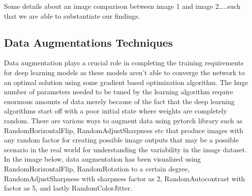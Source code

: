 \documentclass[conference]{IEEEtran}
\begin{document}
Some details about an image comparison between image 1 and image 2…..such that we are able to substantiate our findings.

\subsection{Data Augmentations Techniques}
Data augmentation plays a crucial role in completing the training requirements for deep learning models as these models aren’t able to converge the network to an optimal solution using some gradient based optimization algorithm. The huge number of parameters needed to be tuned by the learning algorithm require enormous amounts of data merely because of the fact that the deep learning algorithms start off with a poor initial state where weights are completely random. There are various ways to augment data using pytorch library such as RandomHorizontalFlip, RandomAdjustSharpness etc that produce images with any random factor for creating possible image outputs that may be a possible scenario in the real world for understanding the variability in the image dataset. 
In the image below, data augmentation has been visualized using RandomHorizontalFlip, RandomRotation to a certain degree, RandomAdjustSharpness with sharpness factor as 2,  RandomAutocontrast with factor as 5, and lastly RandomColorJitter.
\end{document}
